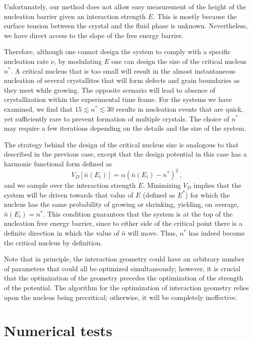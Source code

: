 Unfortunately, our method does not allow easy measurement of the height of the nucleation barrier given an interaction strength $E$.
This is mostly because the surface tension between the crystal and the fluid phase is unknown.
Nevertheless, we have direct access to the slope of the free energy barrier.

Therefore, although one cannot design the system to comply with a specific nucleation rate $\nu$, by modulating $E$ one can design the size of the critical nucleus $n^*$. 
A critical nucleus that is too small will result in the almost instantaneous nucleation of several crystallites that will form defects and grain boundaries as they meet while growing.
The opposite scenario will lead to absence of crystallization within the experimental time frame.
For the systems we have examined, we find that $15 \lesssim n^* \lesssim 30$ results in nucleation events that are quick, yet sufficiently rare to prevent formation of multiple crystals.
The choice of $n^*$ may require a few iterations depending on the details and the size of the system.

The strategy behind the design of the critical nucleus size is analogous to that described in the previous case, except that the design potential in this case has a harmonic functional form defined as
\begin{equation}
	V_D[\bar n(E_i)]=\alpha (\bar n(E_i)-n^*)^2 \,,
\end{equation}
and we sample over the interaction strength $E$.
Minimizing $V_D$ implies that the system will be driven towards that value of $E$ (defined as $E^*$) for which the nucleus has the same probability of growing or shrinking, yielding, on average, $\bar n(E_i) = n^*$.
This condition guarantees that the system is at the top of the nucleation free energy barrier, since to either side of the critical point there is a definite direction in which the value of $\bar n$ will move.
Thus, $n^*$ has indeed become the critical nucleus by definition.

Note that in principle, the interaction geometry could have an arbitrary number of parameters that could all be optimized simultaneously; however, it is crucial that the optimization of the geometry precedes the optimization of the strength of the potential.
The algorithm for the optimization of interaction geometry relies upon the nucleus being precritical; otherwise, it will be completely ineffective.

\section{Numerical tests}

